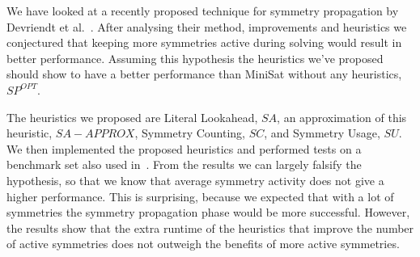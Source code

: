 We have looked at a recently proposed technique for symmetry propagation by Devriendt et al.~\cite{devriendt2012symmetry}.
After analysing their method, improvements and heuristics we conjectured that
keeping more symmetries active during solving would result in better performance.
Assuming this hypothesis the heuristics we've proposed should show to have a better performance than
MiniSat without any heuristics, $SP^{OPT}$.

The heuristics we proposed are Literal Lookahead, $SA$, an approximation of this heuristic, $SA-APPROX$,
Symmetry Counting, $SC$, and Symmetry Usage, $SU$.
We then implemented the proposed heuristics and performed tests on a benchmark set also used in~\cite{devriendt2012symmetry}.
From the results we can largely falsify the hypothesis,
so that we know that average symmetry activity does not give a higher performance.
This is surprising, because we expected that with a lot of symmetries the symmetry propagation phase would be more successful.
However, the results show that the extra runtime of the heuristics
that improve the number of active symmetries does not outweigh the benefits of more active symmetries.